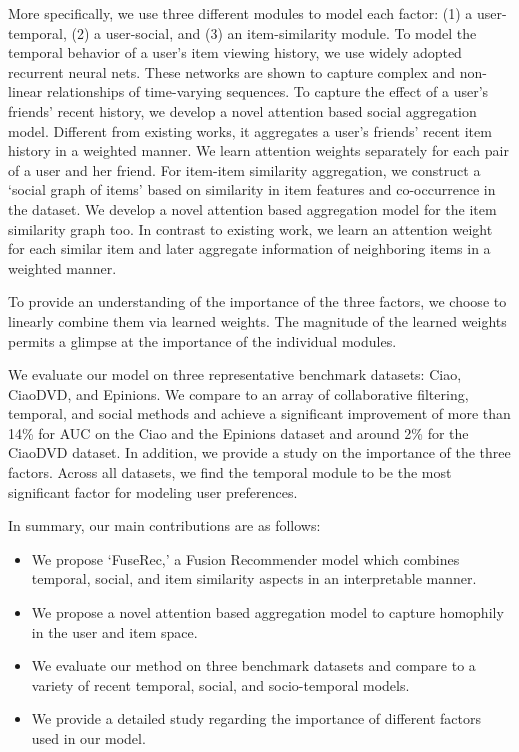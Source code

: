 More specifically, we use three different modules to model each factor: (1) a user-temporal, (2) a user-social, and (3) an item-similarity module.
To model the temporal behavior of a user's item viewing history, we use widely adopted recurrent neural nets. These networks are shown to capture complex and non-linear relationships of time-varying sequences. To capture the effect of a user's friends' recent history, we develop a novel attention based social aggregation model. Different from existing works, it aggregates a user's friends' recent item history in a weighted manner. We learn attention weights separately for each pair of a user and her friend.
For item-item similarity aggregation, we construct a `social graph of items' based on similarity in item features and co-occurrence in the dataset. We develop a novel attention based aggregation model for the item similarity graph too.
In contrast to existing work, we learn an attention weight for each similar item and later aggregate information of neighboring items in a weighted manner.

To provide an understanding of the importance of the three factors, we choose to linearly combine them via learned weights. The magnitude of the learned weights permits a glimpse at the importance of the individual modules.


We evaluate our model on three representative benchmark datasets: Ciao, CiaoDVD, and Epinions. We compare to an array of collaborative filtering, temporal, and social methods and achieve a significant improvement of more than 14\% for AUC on the Ciao and the Epinions dataset and around 2\% for the CiaoDVD dataset. In addition, we provide a study on the importance of the three factors. Across all datasets, we find the temporal module to be the most significant factor for modeling user preferences.

In summary, our main contributions are as follows:
\begin{itemize}
    \item We propose `FuseRec,' a Fusion Recommender model which combines temporal, social, and item similarity aspects in an interpretable manner.
    \item  We propose a novel attention based aggregation model to capture homophily in the user and item space.
    \item We evaluate our method on three benchmark datasets and compare to a variety of recent temporal, social, and socio-temporal models.
    \item We provide a detailed study regarding the importance of different factors used in our model.
\end{itemize}
